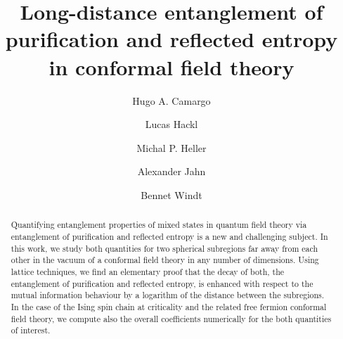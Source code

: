 \documentclass[prl,a4paper,notitlepage,twocolumn,superscriptaddress,longbibliography,reprint]{revtex4-2}
\begin{document}
\title{Long-distance entanglement of purification and reflected entropy \\in conformal field theory}

\author{Hugo A. Camargo}
\author{Lucas Hackl}
\author{Michal P. Heller}
\author{Alexander Jahn}
\author{Bennet Windt}

\begin{abstract}
Quantifying entanglement properties of mixed states in quantum field theory via entanglement of purification and reflected entropy is a new and challenging subject. In this work, we study both quantities for two spherical subregions far away from each other in the vacuum of a conformal field theory in any number of dimensions. Using lattice techniques, we find an elementary proof that the decay of both, the entanglement of purification and reflected entropy, is enhanced with respect to the mutual information behaviour by a logarithm of the distance between the subregions. In the case of the Ising spin chain at criticality and the related free fermion conformal field theory, we compute also the overall coefficients numerically for the both quantities of interest.
\end{abstract}

\maketitle
\end{document}
